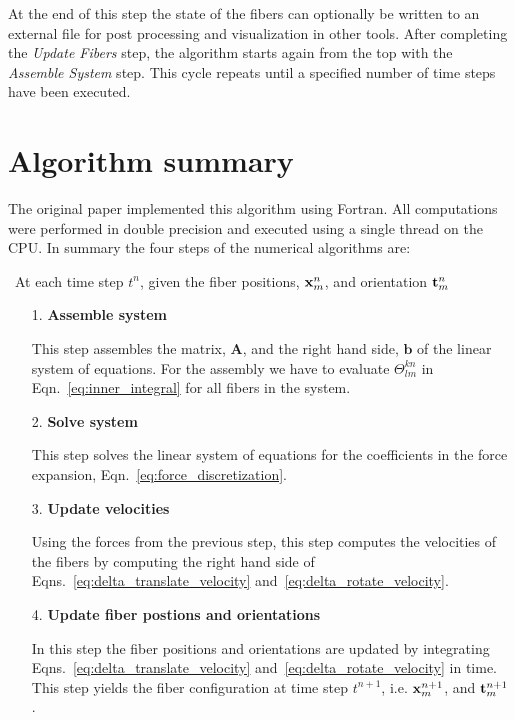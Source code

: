 At the end of this step the state of the fibers can optionally be written to an external file for post processing and visualization in other tools. After completing the \emph{Update Fibers} step, the algorithm starts again from the top with the \emph{Assemble System} step. This cycle repeats until a specified number of time steps have been executed.

\section{Algorithm summary}
\label{sec:algorithm_summary}

The original paper implemented this algorithm using Fortran. All computations were performed in double precision and executed using a single thread on the CPU. In summary the four steps of the numerical algorithms are:

~\linebreak[4]At each time step $t^n$, given the fiber positions, $\mathbf{x}_m^n$,  and
orientation $\mathbf{t}_m^n$

\begin{itemize}
\item[1.] {\textbf{Assemble system}}

This step assembles the matrix, $\mathbf{A}$, and the right hand side, $\mathbf{b}$ of the linear system of equations. For the assembly we have to
evaluate $\Theta_{lm}^{kn}$ in Eqn.~\eqref{eq:inner_integral} for all fibers in the
system.
\item[2.] {\textbf{Solve system}} 

This step solves the linear system of equations for the coefficients in the force expansion, Eqn.~\eqref{eq:force_discretization}.
\item[3.] {\textbf{Update velocities}}

Using the forces from the previous step, this step computes the velocities of the fibers by computing the right hand side of Eqns.~\eqref{eq:delta_translate_velocity} and~\eqref{eq:delta_rotate_velocity}. 
\item[4.] {\textbf{Update fiber postions and orientations}}

In this step the fiber positions and orientations are updated by integrating Eqns.~\eqref{eq:delta_translate_velocity} and~\eqref{eq:delta_rotate_velocity} in time. This step yields the fiber configuration at time step $t^{n+1}$, i.e. $\mathbf{x}_m^{n+1}$,  and $\mathbf{t}_m^{n+1}$. 
\end{itemize}


